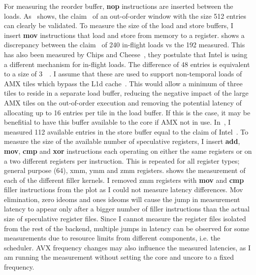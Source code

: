 For measuring the reorder buffer, \textbf{nop} instructions are inserted between the loads.
As~ shows, the claim~\cite{ServerTheHome_2023_SPR_Press,Wccftech_2023_SPR_Press} of an out-of-order window with the size \SI{512}{} entries can clearly be validated.
To measure the size of the load and store buffers, I insert \textbf{mov} instructions that load and store from memory to a register.
 shows a discrepancy between the claim~\cite{ServerTheHome_2023_SPR_Press,Wccftech_2023_SPR_Press} of 240 in-flight loads vs the 192 measured.
This has also been measured by Chips and Cheese~\cite{Chipsandcheese_2023_GoldenCove_Vector_Register}, they postulate that Intel is using a different mechanism for in-flight loads.
The difference of 48 entries is equivalent to a size of \SI{3}{\kibi\byte}.
I assume that these are used to support non-temporal loads of AMX tiles which bypass the L1d cache~\cite[Sec. 20.8]{Intel_Optimization_Reference_Manual_050}.
This would allow a minimum of three tiles to reside in a separate load buffer, reducing the negative impact of the large AMX tiles on the out-of-order execution and removing the potential latency of allocating up to 16 entries per tile in the load buffer.
If this is the case, it may be benefitial to have this buffer available to the core if AMX not in use.
In~, I measured 112 available entries in the store buffer equal to the claim of Intel~\cite{ServerTheHome_2023_SPR_Press,Wccftech_2023_SPR_Press}.
To measure the size of the available number of speculative registers, I insert \textbf{add}, \textbf{mov}, \textbf{cmp} and \textbf{xor} instructions each operating on either the same registers or on a two different registers per instruction.
This is repeated for all register types; general purpose (\SI{64}{\bit}), xmm, ymm and zmm registers.
 shows the measurement of each of the different filler kernels.
I removed zmm registers with \textbf{mov} and \textbf{cmp} filler instructions from the plot as I could not measure latency differences.
Mov elimination, zero ideoms and ones ideoms will cause the jump in measurement latency to appear only after a bigger number of filler instructions than the actual size of speculative register files.
Since I cannot measure the register files isolated from the rest of the backend, multiple jumps in latency can be observed for some measurements due to resource limits from different components, i.e. the scheduler.
AVX frequency changes may also influence the measured latencies, as I am running the measurement without setting the core and uncore to a fixed frequency.
